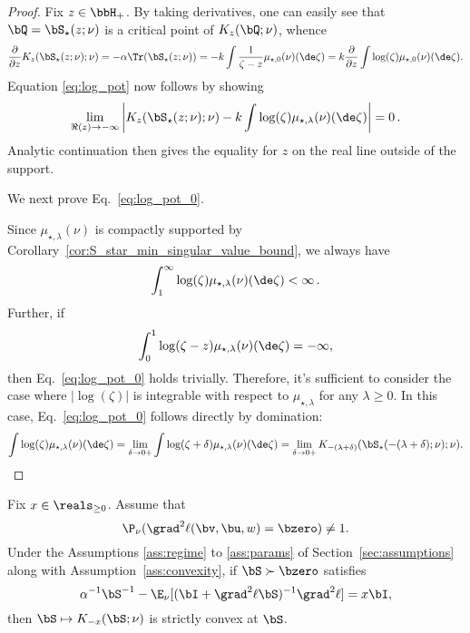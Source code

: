 \begin{proof}
Fix $z\in\bbH_+$.
By taking derivatives, one can easily see that $\bQ = \bS_\star(z;\nu)$ is a critical point of $K_z(\bQ;\nu)$,
whence
\begin{equation}
   \frac{\partial}{\partial z} K_z(\bS_\star(z;\nu);\nu) =  -\alpha \Tr(\bS_\star(z;\nu)) = - k  \int \frac1{\zeta - z} \mu_{\star,0}(\nu)(\de\zeta) =  
k \frac{\partial}{\partial z}\int \log(\zeta )\mu_{\star,0}(\nu)(\de\zeta).
\end{equation}
Equation \eqref{eq:log_pot} now follows by showing
%
\begin{align}
    \lim_{\Re(z)\to-\infty}\left| K_z(\bS_\star(z;\nu);\nu)-k\int \log(\zeta )\mu_{\star,\lambda}(\nu)(\de\zeta)
    \right| = 0\, .
\end{align}
%
Analytic continuation then gives the equality for $z$ on the real line outside of the support.

We next prove Eq.~\eqref{eq:log_pot_0}.


Since $\mu_{\star,\lambda}(\nu)$ is compactly supported
by Corollary~\ref{cor:S_star_min_singular_value_bound},
 we always have 
\begin{equation}
\int_1^{\infty} \log(\zeta )\mu_{\star,\lambda}(\nu)(\de\zeta)  <\infty\, . 
\end{equation}
%
Further, if 
\begin{equation}
\int_{0}^{1} \log(\zeta-z )\mu_{\star,\lambda}(\nu)(\de\zeta)  = -\infty,
\end{equation}
then Eq.~\eqref{eq:log_pot_0} holds trivially.
Therefore, it's sufficient to consider the case where $|\log(\zeta)|$ is integrable with respect to $\mu_{\star,\lambda}$ for any $\lambda\ge 0$. In this case, Eq.~\eqref{eq:log_pot_0} follows directly by domination:
\begin{align}
 \int \log(\zeta )\mu_{\star,\lambda}(\nu)(\de\zeta) 
= 
\lim_{\delta \to 0+}\int \log(\zeta  + \delta)\mu_{\star,\lambda}(\nu)(\de\zeta) 
=
\lim_{\delta \to 0+}
K_{-(\lambda+\delta)}(\bS_{\star}(-(\lambda+\delta);\nu);\nu).
\end{align}
\end{proof}


\begin{lemma}
\label{lemma:strict_convexity_K}
Fix  $x\in\reals_{\ge 0}$.
Assume that 
\begin{equation}
\label{eq:ass_nondegenerate_as}
    \P_\nu(\grad^2\ell(\bv,\bu,w) = \bzero ) \neq 1.
\end{equation}
Under the 
Assumptions \ref{ass:regime} to \ref{ass:params} 
 of Section~\ref{sec:assumptions} along with Assumption~\ref{ass:convexity}, if $\bS\succ\bzero$ satisfies
\begin{equation}
\label{eq:derivative_K_0}
    \alpha^{-1} \bS^{-1} -\E_\nu[(\bI + \grad^2\ell \bS)^{-1}\grad^2\ell] = x\bI,
\end{equation}
then $\bS \mapsto K_{-x}(\bS; \nu)$ is
strictly convex at $\bS$.
\end{lemma}

